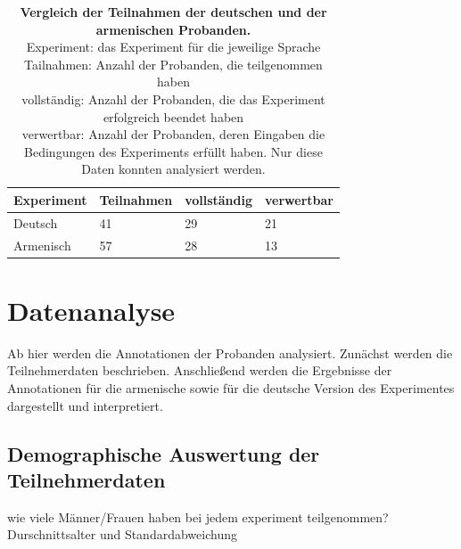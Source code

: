 \documentclass[11pt,a4paper,headsepline,twoside,toc=bibliography]{scrreprt}
\begin{document}
{
	\renewcommand{\arraystretch}{1.2}
	\begin{table}[!t]
		\centering
		
		\caption{\textbf{Vergleich der Teilnahmen der deutschen und der armenischen Probanden.}\\
		Experiment: das Experiment für die jeweilige Sprache\\
		Tailnahmen: Anzahl der Probanden, die teilgenommen haben\\
		vollständig: Anzahl der Probanden, die das Experiment erfolgreich beendet haben\\
		verwertbar: Anzahl der Probanden, deren Eingaben die Bedingungen des Experiments erfüllt haben. Nur diese Daten konnten analysiert werden.} \label{table:participants}
		
		\begin{tabular}{@{}llll}
			
			\toprule			
			\textbf{Experiment} & \textbf{Teilnahmen} & \textbf{vollständig} & \textbf{verwertbar}\\			
			\midrule			
			 Deutsch & 41 & 29 & 21\\						
			 Armenisch & 57 & 28 & 13\\				
			\bottomrule				
			
		\end{tabular}
		
	\end{table}
}


 
\chapter{Datenanalyse}

Ab hier werden die Annotationen der Probanden analysiert. Zunächst werden die Teilnehmerdaten beschrieben. Anschließend werden die Ergebnisse der Annotationen für die armenische sowie für die deutsche Version des Experimentes dargestellt und interpretiert.

\section{Demographische Auswertung der Teilnehmerdaten}

wie viele Männer/Frauen haben bei jedem experiment teilgenommen? 
Durschnittsalter und Standardabweichung
\end{document}
